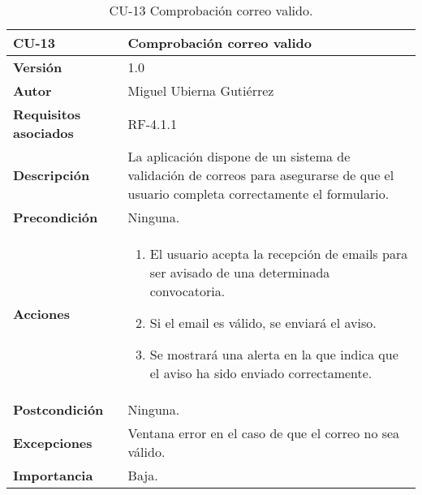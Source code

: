 \begin{table}[p]
	\centering
	\begin{tabularx}{\linewidth}{ p{} p{} }
		\toprule
		\textbf{CU-13}    & \textbf{Comprobación correo valido}\\
		\toprule
		\textbf{Versión}              & 1.0    \\
		\textbf{Autor}                & Miguel Ubierna Gutiérrez \\
		\textbf{Requisitos asociados} & RF-4.1.1  \\
		\textbf{Descripción}          & La aplicación dispone de un sistema de validación de correos para asegurarse de que el usuario completa correctamente el formulario.  \\
		\textbf{Precondición}         & Ninguna.\\
		\textbf{Acciones}             &
		\begin{enumerate}
			\def\labelenumi{\arabic{enumi}.}
			\tightlist
			\item El usuario acepta la recepción de emails para ser avisado de una determinada convocatoria.
                \item Si el email es válido, se enviará el aviso.
                \item Se mostrará una alerta en la que indica que el aviso ha sido enviado correctamente.
		\end{enumerate}\\
		\textbf{Postcondición}        & Ninguna. \\
		\textbf{Excepciones}          & Ventana error en el caso de que el correo no sea válido. \\
		\textbf{Importancia}          & Baja.  \\
		\bottomrule
	\end{tabularx}
	\caption{CU-13 Comprobación correo valido.}
\end{table}


